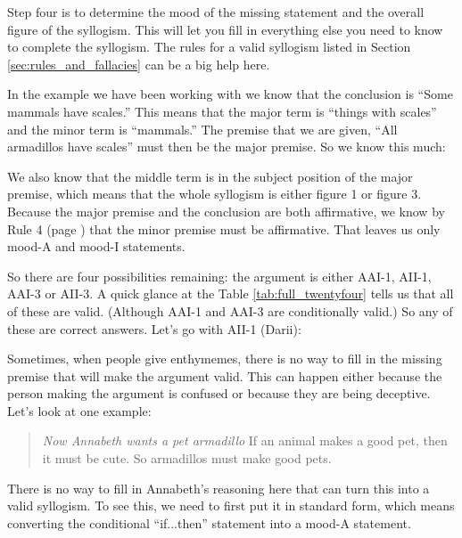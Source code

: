 Step four is to determine the mood of the missing statement and the overall figure of the syllogism. This will let you fill in everything else you need to know to complete the syllogism. The rules for a valid syllogism listed in Section \ref{sec:rules_and_fallacies} can be a big help here.

In the example we have been working with we know that the conclusion is ``Some mammals have scales.'' This means that the major term is ``things with scales'' and the minor term is ``mammals.'' The premise that we are given, ``All armadillos have scales'' must then be the major premise. So we know this much:

\begin{kormanize}
\end{kormanize}

We also know that the middle term is in the subject position of the major premise, which means that the whole syllogism is either figure 1 or figure 3. Because the major premise and the conclusion are both affirmative, we know by Rule 4 (page \pageref{rule4}) that the minor premise must be affirmative. That leaves us only mood-A and mood-I statements. \label{rule_use}

So there are four possibilities remaining: the argument is either AAI-1, AII-1, AAI-3 or AII-3. A quick glance at the Table \ref{tab:full_twentyfour} tells us that all of these are valid. (Although AAI-1 and AAI-3 are conditionally valid.) So any of these are correct answers. Let's go with AII-1 (Darii):


\begin{kormanize}
\end{kormanize}

Sometimes, when people give enthymemes, there is no way to fill in the missing premise that will make the argument valid. This can happen either because the person making the argument is confused or because they are being deceptive. Let's look at one example:

\begin{quotation}\noindent\textit{Now Annabeth wants a pet armadillo} If an animal makes a good pet, then it must be cute. So armadillos must make good pets. \end{quotation}

There is no way to fill in Annabeth's reasoning here that can turn this into a valid syllogism. To see this, we need to first put it in standard form, which means converting the conditional ``if...then'' statement into a mood-A statement.


